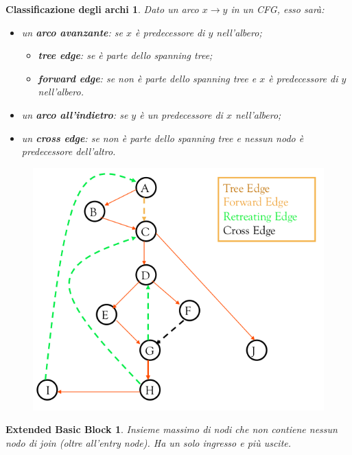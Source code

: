 \documentclass[a4paper, 11pt]{report}
\begin{document}
\newtheorem*{definit3}{Classificazione degli archi}
\begin{definit3}
	Dato un arco $x \rightarrow y$ in un CFG, esso sarà:
	\begin{itemize}
		\item un \textbf{arco avanzante}: se $x$ è predecessore di $y$ nell'albero;
		\begin{itemize}
			\item \textbf{tree edge}: se è parte dello spanning tree;
			\item \textbf{forward edge}: se non è parte dello spanning tree e $x$ è predecessore di $y$ nell'albero.
		\end{itemize}
		\item un \textbf{arco all'indietro}: se $y$ è un predecessore di $x$ nell'albero;
		\item un \textbf{cross edge}: se non è parte dello spanning tree e nessun nodo è predecessore dell'altro.
	\end{itemize}
	\begin{figure}[H]
		\centering
		\includegraphics[scale=0.27]{Edges}
	\end{figure}
\end{definit3}

\newtheorem*{definit4}{Extended Basic Block}
\begin{definit4}
	Insieme massimo di nodi che non contiene nessun nodo di join (oltre all'entry node). Ha un solo ingresso e più uscite.
\end{definit4}
\end{document}

